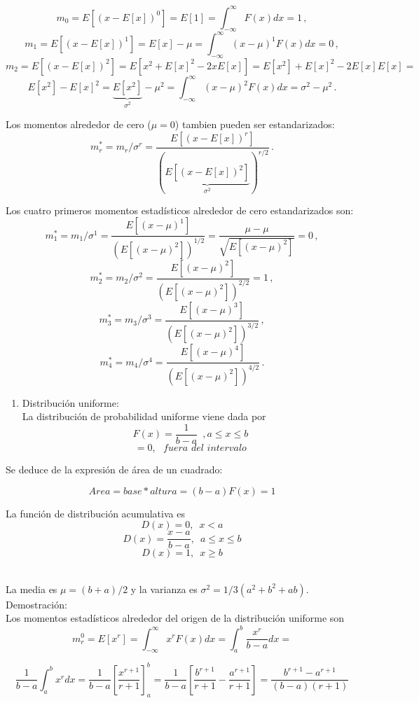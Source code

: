 \documentclass[
]{agujournal2019}
\providecommand{\tightlist}{%
  \setlength{\itemsep}{0pt}\setlength{\parskip}{0pt}}\usepackage{longtable,booktabs,array}
\begin{document}
\[m_0=E[(x-E[x])^0]=E[1]=\int^{\infty}_{-\infty}F(x)dx=1\,,\]
\[m_1=E[(x-E[x])^1]=E[x]-\mu=\int^{\infty}_{-\infty} (x-\mu)^1 F(x)dx=0\,,\]
\[m_2=E[(x-E[x])^2]=E[x^2 + E[x]^2 -2xE[x]]=
      E[x^2]+E[x]^2-2E[x]E[x]=\]
\[E[x^2]-E[x]^2=\underbrace{E[x^2]}_{\sigma^2}-\mu^2=\int^{\infty}_{-\infty} (x-\mu)^2 F(x)dx=\sigma^2-\mu^2\,.\]

Los momentos alrededor de cero (\(\mu=0\)) tambien pueden ser
estandarizados:
\[m^*_r=m_r/\sigma^r=\frac{E[(x-E[x])^r]}{(\underbrace{E[(x-E[x])^2]}_{\sigma^2})^{r/2}}\,.\]

Los cuatro primeros momentos estadísticos alrededor de cero
estandarizados son:
\[m^*_1=m_1/\sigma^1=\frac{E[(x-\mu)^1]}{(E[(x-\mu)^2])^{1/2}}=\frac{\mu-\mu}{\sqrt{E[(x-\mu)^2]}}=0\,,\]
\[m^*_2=m_2/\sigma^2=\frac{E[(x-\mu)^2]}{(E[(x-\mu)^2])^{2/2}}=1\,,\]
\[m^*_3=m_3/\sigma^3=\frac{E[(x-\mu)^3]}{(E[(x-\mu)^2])^{3/2}}\,,\]
\[m^*_4=m_4/\sigma^4=\frac{E[(x-\mu)^4]}{(E[(x-\mu)^2])^{4/2}}\,.\]

\vspace{0.5cm}

\begin{enumerate}
\def\labelenumi{\arabic{enumi}.}
\tightlist
\item
  Distribución uniforme:\\
  La distribución de probabilidad uniforme viene dada por
  \[F(x)=\frac{1}{b-a}\,\,\,, a \le x \le b\]
  \[=0,\,\,\,\,fuera\,\,del\,\,intervalo\]
\end{enumerate}

Se deduce de la expresión de área de un cuadrado:

\[Area=base*altura=(b-a)F(x)=1\]

La función de distribución acumulativa es \[D(x)=0,\,\,\,x<a\]
\[D(x)=\frac{x-a}{b-a},\,\,\,a \le x \le b\] \[D(x)=1,\,\,\,x \ge b\]\\

\begin{center}
\end{center}

La media es \(\mu=(b+a)/2\) y la varianza es
\(\sigma^2=1/3(a^2 + b^2 +ab)\). Demostración:\\

Los momentos estadísticos alrededor del origen de la distribución
uniforme son
\[m^0_r=E[x^r]=\int^{\infty}_{-\infty} x^rF(x)dx=\int^{b}_{a} \frac{x^r}{b-a}dx=\]

\[\frac{1}{b-a}\int^{b}_{a}x^r dx=\frac{1}{b-a}\left[\frac{x^{r+1}}{r+1}\right]^b_a=
      \frac{1}{b-a}\left[\frac{b^{r+1}}{r+1}-\frac{a^{r+1}}{r+1}\right]=\frac{b^{r+1}-a^{r+1}}{(b-a)(r+1)}\]
\end{document}
